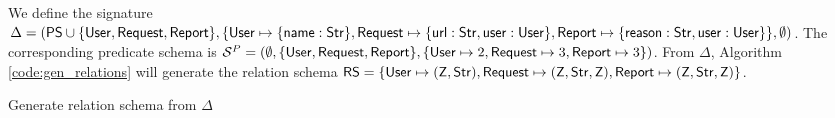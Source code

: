 \begin{example}
	\label{ex:relation_schema_from_sig}
	We define the signature $\Delta = (\mathsf{PS} \cup \{ \mathsf{User}, \mathsf{Request}, \mathsf{Report} \},\\ \{ \mathsf{User} \mapsto \{ \mathsf{name}: \mathsf{Str} \}, \mathsf{Request} \mapsto \{ \mathsf{url}: \mathsf{Str}, \mathsf{user}: \mathsf{User} \}, \mathsf{Report} \mapsto \{ \mathsf{reason}: \mathsf{Str}, \\ \mathsf{user}: \mathsf{User} \} \}, \emptyset)$. The corresponding predicate schema is $\mathcal{S}^P = (\emptyset, \{ \mathsf{User}, \mathsf{Request},\\ \mathsf{Report} \}, \{ \mathsf{User} \mapsto 2, \mathsf{Request} \mapsto 3, \mathsf{Report} \mapsto 3 \})$. From $\Delta$, Algorithm \ref{code:gen_relations} will generate the relation schema $\mathsf{RS} = \{ \mathsf{User} \mapsto (\mathsf{Z}, \mathsf{Str}), \mathsf{Request} \mapsto (\mathsf{Z}, \mathsf{Str}, \mathsf{Z}), \mathsf{Report} \mapsto (\mathsf{Z}, \mathsf{Str}, \mathsf{Z}) \}$.
\end{example}

\begin{algorithm}
	\LinesNumbered
	\label{code:gen_relations}
	\caption{Generate relation schema from $\Delta$}
\end{algorithm}

